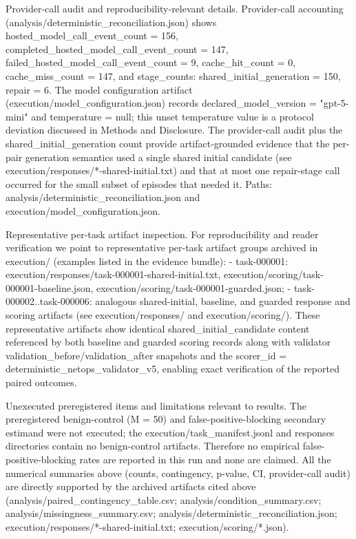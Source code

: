 \documentclass[conference]{IEEEtran}
\begin{document}
Provider-call audit and reproducibility-relevant details. Provider-call accounting (analysis/deterministic\_reconciliation.json) shows hosted\_model\_call\_event\_count = 156, completed\_hosted\_model\_call\_event\_count = 147, failed\_hosted\_model\_call\_event\_count = 9, cache\_hit\_count = 0, cache\_miss\_count = 147, and stage\_counts: shared\_initial\_generation = 150, repair = 6. The model configuration artifact (execution/model\_configuration.json) records declared\_model\_version = "gpt-5-mini" and temperature = null; this unset temperature value is a protocol deviation discussed in Methods and Disclosure. The provider-call audit plus the shared\_initial\_generation count provide artifact-grounded evidence that the per-pair generation semantics used a single shared initial candidate (see execution/responses/*-shared-initial.txt) and that at most one repair-stage call occurred for the small subset of episodes that needed it. Paths: analysis/deterministic\_reconciliation.json and execution/model\_configuration.json.

Representative per-task artifact inspection. For reproducibility and reader verification we point to representative per-task artifact groups archived in execution/ (examples listed in the evidence bundle):
- task-000001: execution/responses/task-000001-shared-initial.txt, execution/scoring/task-000001-baseline.json, execution/scoring/task-000001-guarded.json;
- task-000002..task-000006: analogous shared-initial, baseline, and guarded response and scoring artifacts (see execution/responses/ and execution/scoring/). 
These representative artifacts show identical shared\_initial\_candidate content referenced by both baseline and guarded scoring records along with validator validation\_before/validation\_after snapshots and the scorer\_id = deterministic\_netops\_validator\_v5, enabling exact verification of the reported paired outcomes.

Unexecuted preregistered items and limitations relevant to results. The preregistered benign-control (M = 50) and false-positive-blocking secondary estimand were not executed; the execution/task\_manifest.jsonl and responses directories contain no benign-control artifacts. Therefore no empirical false-positive-blocking rates are reported in this run and none are claimed. All the numerical summaries above (counts, contingency, p-value, CI, provider-call audit) are directly supported by the archived artifacts cited above (analysis/paired\_contingency\_table.csv; analysis/condition\_summary.csv; analysis/missingness\_summary.csv; analysis/deterministic\_reconciliation.json; execution/responses/*-shared-initial.txt; execution/scoring/*.json).
\end{document}

